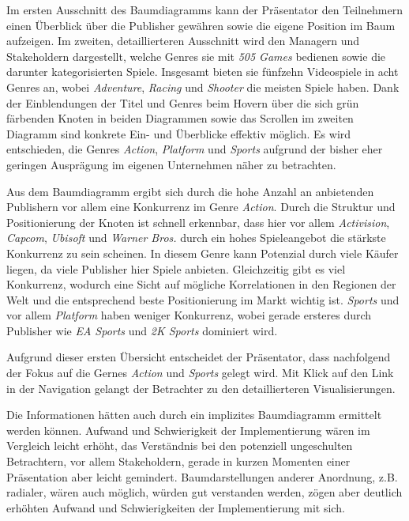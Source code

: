 \documentclass[usegeometry=true]{scrartcl}
\begin{document}
Im ersten Ausschnitt des Baumdiagramms kann der Präsentator den Teilnehmern einen Überblick über die Publisher gewähren sowie die eigene Position im Baum aufzeigen.
Im zweiten, detaillierteren Ausschnitt wird den Managern und Stakeholdern dargestellt, welche Genres sie mit \textit{505 Games} bedienen sowie die darunter kategorisierten Spiele.
Insgesamt bieten sie fünfzehn Videospiele in acht Genres an, wobei \textit{Adventure}, \textit{Racing} und \textit{Shooter} die meisten Spiele haben.
Dank der Einblendungen der Titel und Genres beim Hovern über die sich grün färbenden Knoten in beiden Diagrammen sowie das Scrollen im zweiten Diagramm sind konkrete Ein- und Überblicke effektiv möglich. 
Es wird entschieden, die Genres \textit{Action}, \textit{Platform} und \textit{Sports} aufgrund der bisher eher geringen Ausprägung im eigenen Unternehmen näher zu betrachten. 

Aus dem Baumdiagramm ergibt sich durch die hohe Anzahl an anbietenden Publishern vor allem eine Konkurrenz im Genre \textit{Action}. 
Durch die Struktur und Positionierung der Knoten ist schnell erkennbar, dass hier vor allem \textit{Activision}, \textit{Capcom}, \textit{Ubisoft} und \textit{Warner Bros.} durch ein hohes Spieleangebot die stärkste Konkurrenz zu sein scheinen. 
In diesem Genre kann Potenzial durch viele Käufer liegen, da viele Publisher hier Spiele anbieten. 
Gleichzeitig gibt es viel Konkurrenz, wodurch eine Sicht auf mögliche Korrelationen in den Regionen der Welt und die entsprechend beste Positionierung im Markt wichtig ist.
\textit{Sports} und vor allem \textit{Platform} haben weniger Konkurrenz, wobei gerade ersteres durch Publisher wie \textit{EA Sports} und \textit{2K Sports} dominiert wird.

Aufgrund dieser ersten Übersicht entscheidet der Präsentator, dass nachfolgend der Fokus auf die Gernes \textit{Action} und \textit{Sports} gelegt wird.
Mit Klick auf den Link in der Navigation gelangt der Betrachter zu den detaillierteren Visualisierungen.

Die Informationen hätten auch durch ein implizites Baumdiagramm ermittelt werden können. Aufwand und Schwierigkeit der Implementierung wären im Vergleich leicht erhöht, das Verständnis bei den potenziell ungeschulten Betrachtern, vor allem Stakeholdern, gerade in kurzen Momenten einer Präsentation aber leicht gemindert. 
Baumdarstellungen anderer Anordnung, z.B. radialer, wären auch möglich, würden gut verstanden werden, zögen aber deutlich erhöhten Aufwand und Schwierigkeiten der Implementierung mit sich. 
\end{document}
